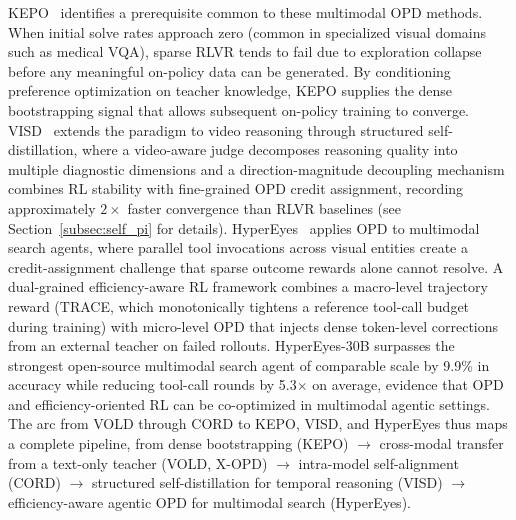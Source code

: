 \documentclass{article} %
\begin{document}
KEPO~\citep{2602.00400} identifies a prerequisite common to these multimodal OPD methods. When initial solve rates approach zero (common in specialized visual domains such as medical VQA), sparse RLVR tends to fail due to exploration collapse before any meaningful on-policy data can be generated. By conditioning preference optimization on teacher knowledge, KEPO supplies the dense bootstrapping signal that allows subsequent on-policy training to converge. VISD~\citep{2605.06094} extends the paradigm to video reasoning through structured self-distillation, where a video-aware judge decomposes reasoning quality into multiple diagnostic dimensions and a direction-magnitude decoupling mechanism combines RL stability with fine-grained OPD credit assignment, recording approximately $2\times$ faster convergence than RLVR baselines (see Section~\ref{subsec:self_pi} for details). HyperEyes~\citep{2605.07177} applies OPD to multimodal search agents, where parallel tool invocations across visual entities create a credit-assignment challenge that sparse outcome rewards alone cannot resolve. A dual-grained efficiency-aware RL framework combines a macro-level trajectory reward (TRACE, which monotonically tightens a reference tool-call budget during training) with micro-level OPD that injects dense token-level corrections from an external teacher on failed rollouts. HyperEyes-30B surpasses the strongest open-source multimodal search agent of comparable scale by 9.9\% in accuracy while reducing tool-call rounds by 5.3$\times$ on average, evidence that OPD and efficiency-oriented RL can be co-optimized in multimodal agentic settings. The arc from VOLD through CORD to KEPO, VISD, and HyperEyes thus maps a complete pipeline, from dense bootstrapping (KEPO) $\to$ cross-modal transfer from a text-only teacher (VOLD, X-OPD) $\to$ intra-model self-alignment (CORD) $\to$ structured self-distillation for temporal reasoning (VISD) $\to$ efficiency-aware agentic OPD for multimodal search (HyperEyes).
\end{document}
